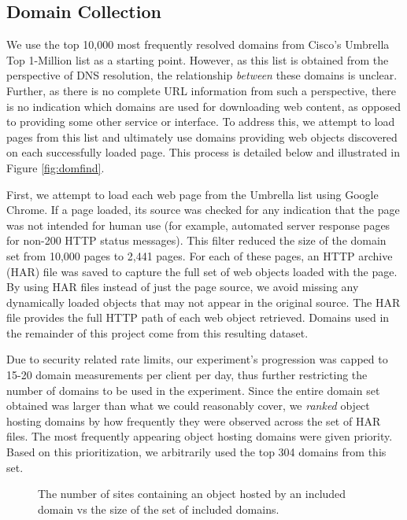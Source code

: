 \subsection{Domain Collection} \label{domcollect}

We use the top 10,000 most frequently resolved domains from Cisco's Umbrella Top
1-Million list \cite{scheitle2018} as a starting point. 
However, as this list is obtained from
the perspective of DNS resolution, the relationship \emph{between} these domains
is unclear. Further, as there is no complete URL information from such a
perspective, there is no indication which domains are used for downloading web
content, as opposed to providing some other service or interface. To address
this, we attempt to load pages from this list and ultimately use domains
providing web objects discovered on each successfully loaded page. This process
is detailed below and illustrated in Figure \ref{fig:domfind}.

First, we attempt to load each web page from the Umbrella list using Google
Chrome. If a page loaded, its source was checked for any indication that the
page was not intended for human use (for example, automated server response
pages for non-200 HTTP status messages). This filter reduced the size of the
domain set from 10,000 pages to 2,441 pages. For each of these pages, an HTTP
archive (HAR) file was saved to capture the full set of web objects loaded with
the page. By using HAR files instead of just the page source, we avoid missing
any dynamically loaded objects that may not appear in the original source. 
The HAR file provides the full HTTP path of each web object retrieved. Domains
used in the remainder of this project come from this resulting dataset. 

Due to security related rate limits, our experiment's progression was capped to
15-20 domain measurements per client per day, thus further restricting the
number of domains to be used in the experiment. Since the entire domain set obtained
was larger than what we could reasonably cover, we \emph{ranked} object hosting domains by how frequently they were
observed across the set of HAR files. The most frequently appearing object
hosting domains were given priority.  Based on this prioritization, we
arbitrarily used the top 304 domains from this set. 

\begin{figure}
    \caption{The number of sites containing an object hosted by an included domain vs
    the size of the set of included domains.}
    \label{fig:sitescovered}
\end{figure}

